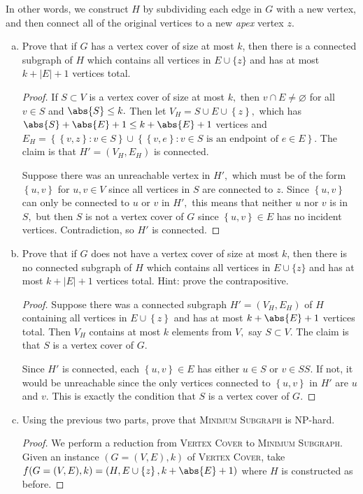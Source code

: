 \documentclass{article}
\begin{document}
In other words, we construct $H$ by subdividing each edge in $G$ with a new vertex, and then connect all of the original vertices to a new \emph{apex} vertex $z$.  

\begin{enumerate}[(a), resume]
	\item Prove that if $G$ has a vertex cover of size at most $k$, then there is a connected subgraph of $H$ which contains all vertices in $E \cup \{z\}$ and has at most $k+|E|+1$ vertices total.
		\begin{proof}
			If $S\subset V$ is a vertex cover of size at most $k,$ then $v\cap E\neq \varnothing$ for all $v\in S$ and $\abs{S}\le k.$ Then let $V_H=S\cup E\cup\left\{ z \right\},$ which has $\abs{S}+\abs{E}+1\le k+\abs{E}+1$ vertices and $E_H=\left\{ \left\{ v, z \right\}: v\in S \right\}\cup\left\{ \left\{ v, e \right\}: v\in S \text{ is an endpoint of } e\in E \right\}.$ The claim is that $H'=(V_H, E_H)$ is connected.

			Suppose there was an unreachable vertex in $H',$ which must be of the form $\left\{ u, v \right\}$ for $u, v\in V$ since all vertices in $S$ are connected to $z.$ Since $\left\{ u, v \right\}$ can only be connected to $u$ or $v$ in $H',$ this means that neither $u$ nor $v$ is in $S,$ but then $S$ is not a vertex cover of $G$ since $\left\{ u, v \right\}\in E$ has no incident vertices. Contradiction, so $H'$ is connected.
		\end{proof}

	\item Prove that if $G$ does not have a vertex cover of size at most $k$, then there is no connected subgraph of $H$ which contains all vertices in $E \cup \{z\}$ and has at most $k + |E| + 1$ vertices total.  Hint: prove the contrapositive.
		\begin{proof}
			Suppose there was a connected subgraph $H'=(V_H, E_H)$ of $H$ containing all vertices in $E\cup \left\{ z \right\}$ and has at most $k+\abs{E}+1$ vertices total. Then $V_H$ contains at most $k$ elements from $V,$ say $S\subset V.$ The claim is that $S$ is a vertex cover of $G.$

			Since $H'$ is connected, each $\left\{ u, v \right\}\in E$ has either $u\in S$ or $v\in SS.$ If not, it would be unreachable since the only vertices connected to $\left\{ u, v \right\}$ in $H'$ are $u$ and $v.$ This is exactly the condition that $S$ is a vertex cover of $G.$
		\end{proof}
		
	\item Using the previous two parts, prove that \textsc{Minimum Subgraph} is NP-hard. 
		\begin{proof}
			We perform a reduction from \textsc{Vertex Cover} to \textsc{Minimum Subgraph}. Given an instance $(G=(V, E), k)$ of \textsc{Vertex Cover}, take $f(G=(V, E), k)=(H, E\cup \left\{ z \right\}, k+\abs{E}+1)$ where $H$ is constructed as before. 
			

\end{proof}
\end{enumerate}
\end{document}

